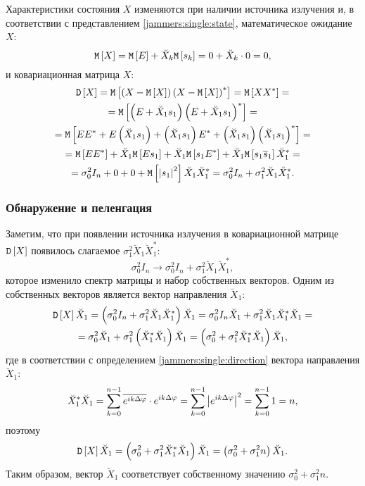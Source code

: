 Характеристики состояния $X$ изменяются при наличии источника излучения и, в соответствии с представлением \eqref{jammers:single:state}, математическое ожидание
$X$:
\[
    \mathtt{M} \left [ X \right ]
    = \mathtt{M} \left [ E \right ] + \breve{X}_k \mathtt{M} \left [ s_k \right ]
    = 0 + \breve{X}_k \cdot 0
    = 0,
\]
и ковариационная матрица $X$:
\begin{multline*}
    \mathtt{D} \left [ X \right ]
    = \mathtt{M} \left [ \left( X - \mathtt{M} \left [ X \right ] \right) \left( X - \mathtt{M} \left [ X \right ] \right)^* \right ]
    = \mathtt{M} \left [ X X^* \right ] = \\
    = \mathtt{M} \left [ \left( E + \breve{X}_1 s_1 \right) \left( E + \breve{X}_1 s_1 \right)^* \right ] = \\
    = \mathtt{M} \left [ E E^* + E \left( \breve{X}_1 s_1 \right) + \left( \breve{X}_1 s_1 \right) E^* + \left( \breve{X}_1 s_1 \right) \left( \breve{X}_1 s_1 \right)^* \right ] = \\
    = \mathtt{M} \left [ E E^* \right ] + \breve{X}_1 \mathtt{M} \left [ E s_1 \right ] + \breve{X}_1 \mathtt{M} \left [ s_1 E^* \right ] + \breve{X}_1 \mathtt{M} \left [ s_1 \overline{s}_1 \right ] \breve{X}_1^* = \\
    = \sigma_0^2 I_n + 0 + 0 + \mathtt{M} \left [ \left | s_1 \right |^2 \right ] \breve{X}_1 \breve{X}_1^*
    = \sigma_0^2 I_n + \sigma_1^2 \breve{X}_1 \breve{X}_1^*
    .
\end{multline*}

\subsubsection{Обнаружение и пеленгация}

Заметим, что при появлении источника излучения в ковариационной матрице $\mathtt{D} \left [ X \right ]$ появилось слагаемое $\sigma_1^2 \breve{X}_1 \breve{X}_1^*$:
\[
    \sigma_0^2 I_n \rightarrow \sigma_0^2 I_n + \sigma_1^2 \breve{X}_1 \breve{X}_1^* ,
\]
которое изменило спектр матрицы и набор собственных векторов. Одним из собственных векторов является вектор направления $\breve{X}_1$:
\begin{multline*}
    \mathtt{D} \left [ X \right ] \breve{X}_1
    = \left( \sigma_0^2 I_n + \sigma_1^2 \breve{X}_1 \breve{X}_1^* \right) \breve{X}_1
    = \sigma_0^2 I_n \breve{X}_1 + \sigma_1^2 \breve{X}_1 \breve{X}_1^* \breve{X}_1 = \\
    = \sigma_0^2 \breve{X}_1 + \sigma_1^2 \left( \breve{X}_1^* \breve{X}_1 \right) \breve{X}_1
    = \left( \sigma_0^2 + \sigma_1^2 \breve{X}_1^* \breve{X}_1 \right) \breve{X}_1 ,
\end{multline*}
где в соответствии с определением \eqref{jammers:single:direction} вектора направления $\breve{X}_1$:
\begin{equation}
    \label{jammers:single:direction_self_product}
    \breve{X}_1^* \breve{X}_1
    = \sum_{k=0}^{n-1} \overline{e^{i k \Delta \varphi}} \cdot e^{i k \Delta \varphi}
    = \sum_{k=0}^{n-1} \left | e^{i k \Delta \varphi} \right |^2
    = \sum_{k=0}^{n-1} 1
    = n ,
\end{equation}
поэтому
\[
    \mathtt{D} \left [ X \right ] \breve{X}_1
    = \left( \sigma_0^2 + \sigma_1^2 \breve{X}_1^* \breve{X}_1 \right) \breve{X}_1
    = \left( \sigma_0^2 + \sigma_1^2 n \right) \breve{X}_1 .
\]
Таким образом, вектор $\breve{X}_1$ соответствует собственному значению $\sigma_0^2 + \sigma_1^2 n$.

